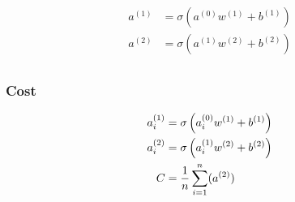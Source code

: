 \documentclass{article}
\begin{document}
\begin{align}
	a^{(1)} &= \sigma\left(a^{(0)}w^{(1)} + b^{(1)}\right) \\	
	a^{(2)} &= \sigma\left(a^{(1)}w^{(2)} + b^{(2)}\right) \\
\end{align}

\subsubsection{Cost}

\begin{align}
	a_i^{(1)} &= \sigma\left(a_i^{(0)}w^{(1)} + b^{(1)}\right) \\	
	a_i^{(2)} &= \sigma\left(a_i^{(1)}w^{(2)} + b^{(2)}\right) \\
	C &= \avgsum[i, n] (a^{(2)}) \\
\end{align}
\end{document}
